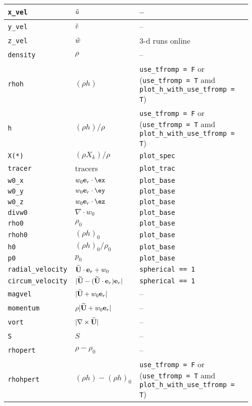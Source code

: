 \begin{center}
\begin{longtable}{|l|p{2.25in}|p{2.5in}|}
{\tt x\_vel}   & $\tilde{u}$  & -- \\
\hline
{\tt y\_vel}   & $\tilde{v}$  & -- \\
\hline
{\tt z\_vel}   & $\tilde{w}$  & 3-d runs online \\
\hline
{\tt density}  & $\rho$ & -- \\
\hline
{\tt rhoh}   & $(\rho h)$ & {\tt use\_tfromp = F} or ({\tt use\_tfromp = T} amd {\tt plot\_h\_with\_use\_tfromp = T}) \\           
\hline
{\tt h}      & $(\rho h)/\rho$   & {\tt use\_tfromp = F} or ({\tt use\_tfromp = T} amd {\tt plot\_h\_with\_use\_tfromp = T}) \\           
\hline
{\tt X(*)}   & $(\rho X_k)/\rho$ & {\tt plot\_spec} \\
\hline
{\tt tracer} & tracers           & {\tt plot\_trac} \\
\hline
{\tt w0\_x}  & $w_0 \er \cdot \ex$ & {\tt plot\_base} \\ 
\hline
{\tt w0\_y}  & $w_0 \er \cdot \ey$ & {\tt plot\_base} \\ 
\hline
{\tt w0\_z}  & $w_0 \er \cdot \ez$ & {\tt plot\_base} \\ 
\hline
{\tt divw0}  & $\nabla \cdot w_0$  & {\tt plot\_base} \\ 
\hline
{\tt rho0}   & $\rho_0$            & {\tt plot\_base} \\ 
\hline
{\tt rhoh0}  & $(\rho h)_0$         & {\tt plot\_base} \\ 
\hline
{\tt h0}     & $(\rho h)_0/\rho_0$  & {\tt plot\_base} \\ 
\hline
{\tt p0}     & $p_0$                & {\tt plot\_base} \\ 
\hline
{\tt radial\_velocity}  & $\widetilde{{\bf U}} \cdot \mathbf{e}_r + w_0$ & {\tt spherical == 1} \\
\hline
{\tt circum\_velocity}  & $| \widetilde{{\bf U}} - (\widetilde{{\bf U}} \cdot \mathbf{e}_r) \mathbf{e}_r |$ &  {\tt spherical == 1}  \\
\hline
{\tt magvel}              & $| \widetilde{{\bf U}} + w_0 \mathbf{e}_r |$  & -- \\
\hline
{\tt momentum}            & $\rho | \widetilde{{\bf U}} + w_0 \mathbf{e}_r |$  & -- \\
\hline
{\tt vort}                & $| \nabla \times \widetilde{{\bf U}} |$   & -- \\
\hline
{\tt S}                   & $S$   & -- \\
\hline
{\tt rhopert}             & $\rho - \rho_0$  & -- \\
\hline
{\tt rhohpert}          & $(\rho h) - (\rho h)_0$ & {\tt use\_tfromp = F} or ({\tt use\_tfromp = T} amd {\tt plot\_h\_with\_use\_tfromp = T}) \\           

\end{longtable}
\end{center}
